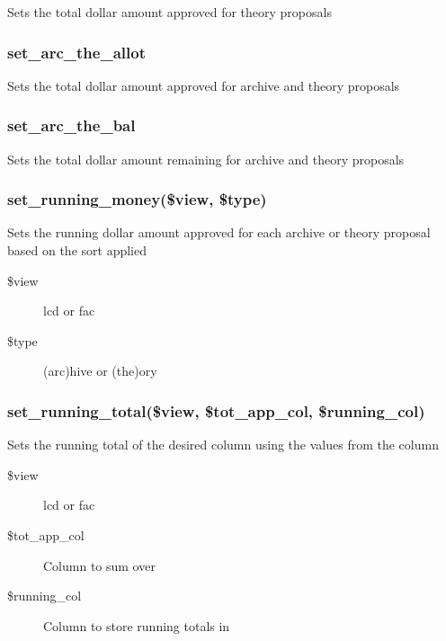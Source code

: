 \documentclass{article}
\begin{document}
Sets the total dollar amount approved for theory proposals

\subsubsection*{set\_arc\_the\_allot\label{Panel_set_arc_the_allot}}


Sets the total dollar amount approved for archive and theory proposals

\subsubsection*{set\_arc\_the\_bal\label{Panel_set_arc_the_bal}}


Sets the total dollar amount remaining for archive and theory proposals

\subsubsection*{set\_running\_money(\$view, \$type)\label{Panel_set_running_money_view_type_}}


Sets the running dollar amount approved for each archive or theory
proposal based on the sort applied

\begin{description}

\item[{\$view}] \mbox{}

lcd or fac


\item[{\$type}] \mbox{}

(arc)hive or (the)ory

\end{description}
\subsubsection*{set\_running\_total(\$view, \$tot\_app\_col, \$running\_col)\label{Panel_set_running_total_view_tot_app_col_running_col_}}


Sets the running total of the desired column using the values from the column

\begin{description}

\item[{\$view}] \mbox{}

lcd or fac


\item[{\$tot\_app\_col}] \mbox{}

Column to sum over


\item[{\$running\_col}] \mbox{}

Column to store running totals in

\end{description}
\end{document}
